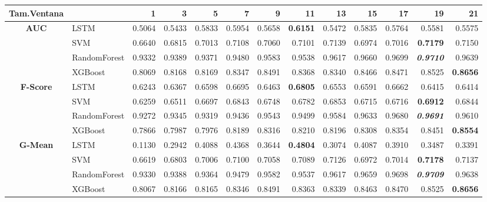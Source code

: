 \begin{table}[H]
	\centering
	\begin{adjustbox}{max width=12cm}
		\begin{tabular}{|c|l|r|r|r|r|r|r|r|r|r|r|r|}
			\hline
			\textbf{Tam.Ventana} &         &      1  &      3  &      5  &      7  &      9  &      11 &      13 &      15 &      17 &      19 &      21 \\
			\hline
			\textbf{AUC} &  LSTM &  0.5064 &  0.5433 &  0.5833 &  0.5954 &  0.5658 & \textbf{  0.6151 } &  0.5472 &  0.5835 &  0.5764 &  0.5581 &  0.5575 \\
			&  SVM &  0.6640 &  0.6815 &  0.7013 &  0.7108 &  0.7060 &  0.7101 &  0.7139 &  0.6974 &  0.7016 & \textbf{  0.7179 } &  0.7150 \\
			&  RandomForest &  0.9332 &  0.9389 &  0.9371 &  0.9480 &  0.9583 &  0.9538 &  0.9617 &  0.9660 &  0.9699 & \textit{ \textbf{  0.9710 } } &  0.9639 \\
			&  XGBoost &  0.8069 &  0.8168 &  0.8169 &  0.8347 &  0.8491 &  0.8368 &  0.8340 &  0.8466 &  0.8471 &  0.8525 & \textbf{  0.8656 } \\
			\hline
			\textbf{F-Score} &  LSTM &  0.6243 &  0.6367 &  0.6598 &  0.6695 &  0.6463 & \textbf{  0.6805 } &  0.6553 &  0.6591 &  0.6662 &  0.6415 &  0.6414 \\
			&  SVM &  0.6259 &  0.6511 &  0.6697 &  0.6843 &  0.6748 &  0.6782 &  0.6853 &  0.6715 &  0.6716 & \textbf{  0.6912 } &  0.6844 \\
			&  RandomForest &  0.9272 &  0.9345 &  0.9319 &  0.9436 &  0.9543 &  0.9499 &  0.9584 &  0.9633 &  0.9680 & \textit{ \textbf{  0.9691 } } &  0.9610 \\
			&  XGBoost &  0.7866 &  0.7987 &  0.7976 &  0.8189 &  0.8316 &  0.8210 &  0.8196 &  0.8308 &  0.8354 &  0.8451 & \textbf{  0.8554 } \\
			\hline
			\textbf{G-Mean} &  LSTM &  0.1130 &  0.2942 &  0.4088 &  0.4368 &  0.3644 & \textbf{  0.4804 } &  0.3074 &  0.4087 &  0.3910 &  0.3487 &  0.3391 \\
			&  SVM &  0.6619 &  0.6803 &  0.7006 &  0.7100 &  0.7058 &  0.7089 &  0.7126 &  0.6972 &  0.7014 & \textbf{  0.7178 } &  0.7137 \\
			&  RandomForest &  0.9330 &  0.9388 &  0.9364 &  0.9479 &  0.9582 &  0.9537 &  0.9617 &  0.9659 &  0.9698 & \textit{ \textbf{  0.9709 } } &  0.9638 \\
			&  XGBoost &  0.8067 &  0.8166 &  0.8165 &  0.8346 &  0.8491 &  0.8363 &  0.8339 &  0.8463 &  0.8470 &  0.8525 & \textbf{  0.8656 } \\

\end{tabular}
\end{adjustbox}
\end{table}

